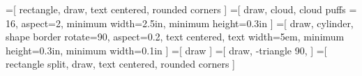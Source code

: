 =[
  rectangle, 
  draw, 
  text centered,
  rounded corners
]
=[
  draw,
  cloud,
  cloud puffs = 16, 
  aspect=2,
  minimum width=2.5in,
  minimum height=0.3in
]
=[
  draw,
  cylinder,
  shape border rotate=90,
  aspect=0.2,
  text centered,
  text width=5em,
  minimum height=0.3in,
  minimum width=0.1in
]
=[
  draw
]
=[
  draw,
  -triangle 90, 
]
=[
	rectangle split,
	draw,
	text centered,
	rounded corners
]
